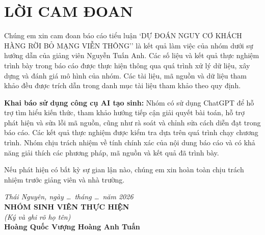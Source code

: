 \documentclass[a4paper]{article}
\begin{document}
\newpage
{}

\section*{\textbf{LỜI CAM ĐOAN}}

Chúng em xin cam đoan báo cáo tiểu luận `DỰ ĐOÁN NGUY CƠ KHÁCH HÀNG RỜI BỎ MẠNG VIỄN THÔNG'' là kết quả làm việc của nhóm dưới sự hướng dẫn của giảng viên Nguyễn Tuấn Anh. Các số liệu và kết quả thực nghiệm trình bày trong báo cáo được thực hiện thông qua quá trình xử lý dữ liệu, xây dựng và đánh giá mô hình của nhóm. Các tài liệu, mã nguồn và dữ liệu tham khảo đều được trích dẫn trong danh mục tài liệu tham khảo theo quy định.

\textbf{Khai báo sử dụng công cụ AI tạo sinh:} Nhóm có sử dụng ChatGPT để hỗ trợ tìm hiểu kiến thức, tham khảo hướng tiếp cận giải quyết bài toán, hỗ trợ phát hiện và sửa lỗi mã nguồn, cũng như rà soát và chỉnh sửa cách diễn đạt trong báo cáo. Các kết quả thực nghiệm được kiểm tra dựa trên quá trình chạy chương trình. Nhóm chịu trách nhiệm về tính chính xác của nội dung báo cáo và có khả năng giải thích các phương pháp, mã nguồn và kết quả đã trình bày.

Nếu phát hiện có bất kỳ sự gian lận nào, chúng em xin hoàn toàn chịu trách nhiệm trước giảng viên và nhà trường.

\vspace{1.2cm}
\begin{flushright}
\begin{minipage}{0.75\textwidth}
\centering
\textit{Thái Nguyên, ngày \dots\ tháng \dots\ năm 2026}\\[0.25cm]
\textbf{NHÓM SINH VIÊN THỰC HIỆN}\\[0.15cm]
\textit{(Ký và ghi rõ họ tên)}\\[2.2cm]
\textbf{Hoàng Quốc Vượng \qquad\qquad Hoàng Anh Tuấn}
\end{minipage}
\end{flushright}

\newpage

\end{document}
